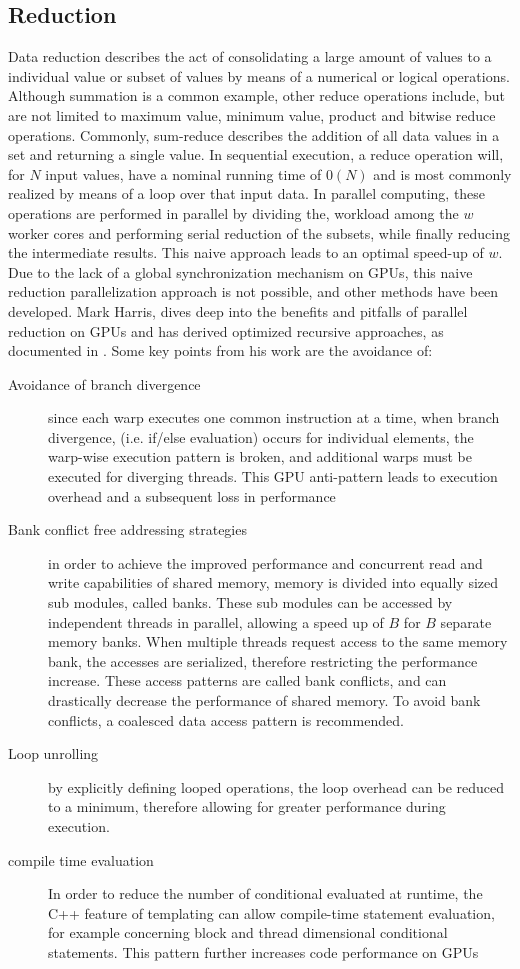 \subsection{Reduction}
Data reduction describes the act of consolidating a large amount of values to
a individual value or subset of values by means of a numerical or logical operations.
Although summation is a common example, other reduce operations include,
but are not limited to maximum value, minimum value, product and bitwise reduce operations.
  Commonly,
sum-reduce describes the addition of all data values in a set and returning a single value.
In sequential execution, a reduce operation will, for $N$ input values, have a nominal
running time of $0(N)$ and is most commonly realized by means of a loop over that
input data.  In parallel computing, these operations are performed in parallel by dividing the,
workload among the $w$ worker cores and performing serial reduction of the subsets,
while finally reducing the intermediate results.  This naive approach leads to an
optimal \gls{speed-up} of $w$.  Due to the lack of a global synchronization mechanism
on \Glspl{GPU}, this naive reduction parallelization approach is not possible,
and other methods have been developed.  Mark Harris, dives deep into the benefits
and pitfalls of parallel reduction on \Glspl{GPU} and has derived optimized
recursive approaches, as documented in \cite{harris}.  Some key points from his work are
the avoidance of:
\begin{description}
  \item [Avoidance of branch divergence]
since each warp executes one common instruction at a time, when branch divergence,
(i.e. if/else evaluation) occurs for individual elements, the warp-wise execution pattern
is broken, and additional warps must be executed for diverging threads. This \Gls{GPU} anti-pattern
leads to execution overhead and a subsequent loss in performance
  \item [Bank conflict free addressing strategies]
  in order to achieve the improved performance and concurrent read and write capabilities
  of shared memory, memory is divided into equally sized sub modules, called banks.
  These sub modules can be accessed by independent threads in parallel, allowing a speed up
  of $B$ for $B$ separate memory banks.  When multiple threads request access to
  the same memory bank, the accesses are serialized, therefore restricting the performance increase.
  These access patterns are called bank conflicts, and can drastically decrease
  the performance of shared memory.  To avoid bank conflicts, a coalesced data
  access pattern is recommended.
  \item [Loop unrolling] by explicitly defining looped operations, the loop overhead
  can be reduced to a minimum, therefore allowing for greater performance during execution.
  \item [compile time evaluation]  In order to reduce the number of conditional
  evaluated at runtime, the C++ feature of templating can allow compile-time statement
  evaluation, for example concerning block and thread dimensional conditional statements.
  This pattern further increases code performance on \Glspl{GPU}
\end{description}
